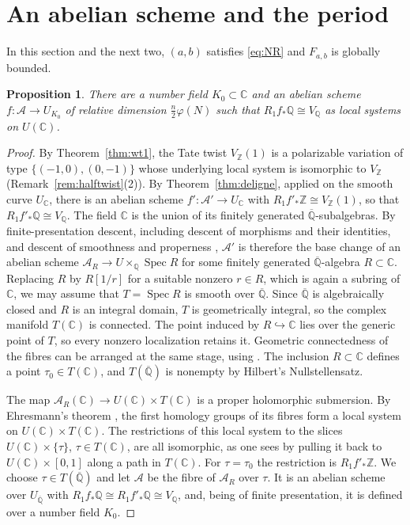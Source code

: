 \documentclass[11pt]{amsart}
\newtheorem{proposition}[theorem]{Proposition}
\theoremstyle{definition}
\theoremstyle{remark}
\numberwithin{equation}{section}
\newcommand{\Q}{\mathbb{Q}}
\newcommand{\Z}{\mathbb{Z}}
\newcommand{\C}{\mathbb{C}}
\newcommand{\Qb}{\overline{\mathbb{Q}}}
\newcommand{\cA}{\mathcal{A}}
\DeclareMathOperator{\Spec}{Spec}
\newcommand{\Fab}{F_{a,b}}
\begin{document}
\section{An abelian scheme and the period}\label{sec:abelian}

In this section and the next two, $(a,b)$ satisfies \eqref{eq:NR} and $\Fab$ is globally bounded.

\begin{proposition}\label{prop:abelian}
There are a number field $K_0\subset\C$ and an abelian scheme $f:\cA\to U_{K_0}$ of relative dimension $\frac n2\varphi(N)$ such that $R_1f_*\Q\cong V_\Q$ as local systems on $U(\C)$.
\end{proposition}

\begin{proof}
By Theorem~\ref{thm:wt1}, the Tate twist $V_\Z(1)$ is a polarizable variation of type $\{(-1,0),(0,-1)\}$ whose underlying local system is isomorphic to $V_\Z$ (Remark~\ref{rem:halftwist}(2)). By Theorem~\ref{thm:deligne}, applied on the smooth curve $U_\C$, there is an abelian scheme $f':\cA'\to U_\C$ with $R_1f'_*\Z\cong V_\Z(1)$, so that $R_1f'_*\Q\cong V_\Q$. The field $\C$ is the union of its finitely generated $\Qb$-subalgebras. By finite-presentation descent, including descent of morphisms and their identities, and descent of smoothness and properness \citep[Tags 01ZM, 0C0C, 081F]{StacksProject}, $\cA'$ is therefore the base change of an abelian scheme $\cA_R\to U\times_\Q\Spec R$ for some finitely generated $\Qb$-algebra $R\subset\C$. Replacing $R$ by $R[1/r]$ for a suitable nonzero $r\in R$, which is again a subring of $\C$, we may assume that $T=\Spec R$ is smooth over $\Qb$. Since $\Qb$ is algebraically closed and $R$ is an integral domain, $T$ is geometrically integral, so the complex manifold $T(\C)$ is connected. The point induced by $R\hookrightarrow\C$ lies over the generic point of $T$, so every nonzero localization retains it. Geometric connectedness of the fibres can be arranged at the same stage, using \citep[Tag 0E0N]{StacksProject}. The inclusion $R\subset\C$ defines a point $\tau_0\in T(\C)$, and $T(\Qb)$ is nonempty by Hilbert's Nullstellensatz.

The map $\cA_R(\C)\to U(\C)\times T(\C)$ is a proper holomorphic submersion. By Ehresmann's theorem \citep[\S1, proposition, p.~154]{Ehresmann1952}, the first homology groups of its fibres form a local system on $U(\C)\times T(\C)$. The restrictions of this local system to the slices $U(\C)\times\{\tau\}$, $\tau\in T(\C)$, are all isomorphic, as one sees by pulling it back to $U(\C)\times[0,1]$ along a path in $T(\C)$. For $\tau=\tau_0$ the restriction is $R_1f'_*\Z$. We choose $\tau\in T(\Qb)$ and let $\cA$ be the fibre of $\cA_R$ over $\tau$. It is an abelian scheme over $U_{\Qb}$ with $R_1f_*\Q\cong R_1f'_*\Q\cong V_\Q$, and, being of finite presentation, it is defined over a number field $K_0$.
\end{proof}
\end{document}
